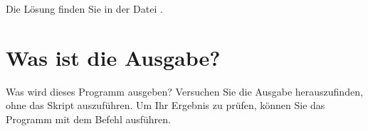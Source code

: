 Die Lösung finden Sie in der Datei .

\section{Was ist die Ausgabe?}



Was wird dieses Programm ausgeben? Versuchen Sie die Ausgabe herauszufinden, ohne das Skript auszuführen. Um Ihr Ergebnis zu prüfen, können Sie das Programm mit dem Befehl  ausführen.

